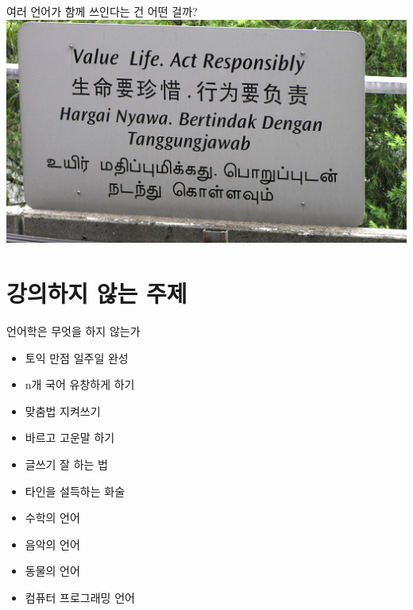\documentclass[11pt, aspectratio=169]{beamer}
\begin{document}
\begin{frame}[t]{}
  \begin{block}{여러 언어가 함께 쓰인다는 건 어떤 걸까?}
    \includegraphics[width=1.0\textwidth]{img/550304175_fbcaca2d23_b.jpg}
  \end{block}
\end{frame}

\section{강의하지 않는 주제}

\begin{frame}[t]{}
  \begin{block}{언어학은 무엇을 하지 않는가}
    \begin{itemize}
      \item 토익 만점 일주일 완성
      \item n개 국어 유창하게 하기
      \item 맞춤법 지켜쓰기
      \item 바르고 고운말 하기
      \item 글쓰기 잘 하는 법
      \item 타인을 설득하는 화술
      \item 수학의 언어
      \item 음악의 언어
      \item 동물의 언어
      \item 컴퓨터 프로그래밍 언어
    \end{itemize}
  \end{block}
\end{frame}
\end{document}
